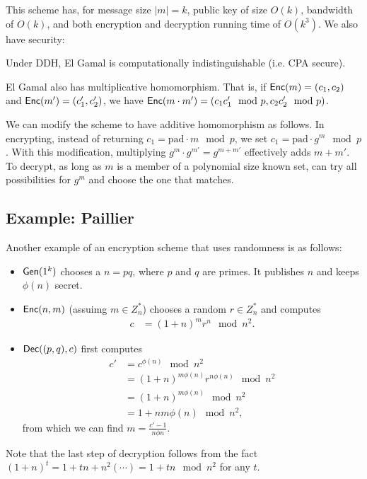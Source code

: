 \documentclass[10pt]{article}
\begin{document}
This scheme has, for message size $|m| = k$, public key of size $O(k)$, bandwidth of $O(k)$, and both encryption and decryption running time of $O(k^3)$. We also have security:
\begin{theorem}
Under DDH, El Gamal is computationally indistinguishable (i.e. CPA secure).
\end{theorem}

El Gamal also has multiplicative homomorphism. That is, if $\mathsf{Enc}(m) = (c_1, c_2)$ and $\mathsf{Enc}(m') = (c_1', c_2')$, we have $\mathsf{Enc}(m \cdot m') = (c_1c_1' \mod p, c_2c_2' \mod p)$. 

We can modify the scheme to have additive homomorphism as follows. In encrypting, instead of returning $c_1 = \text{pad} \cdot m \mod p$, we set $c_1 = \text{pad} \cdot g^m \mod p$. With this modification, multiplying $g^m \cdot g^{m'} = g^{m+m'}$ effectively adds $m+m'$. To decrypt, as long as $m$ is a member of a polynomial size known set, can try all possibilities for $g^m$ and choose the one that matches.

\subsection{Example: Paillier}

Another example of an encryption scheme that uses randomness is as follows:

\begin{itemize}
	\item $\mathsf{Gen}(1^k)$ chooses a $n=pq$, where $p$ and $q$ are primes. It publishes $n$ and keeps $\phi(n)$ secret.
	\item $\mathsf{Enc}(n,m)$ (assuimg $m \in Z_n^*$) chooses a random $r \in Z_n^*$ and computes
	\begin{align*}
	c &= (1+n)^mr^n \mod n^2.
	\end{align*}
	\item $\mathsf{Dec}((p,q),c)$ first computes
	\begin{align*}
	c' &= c^{\phi(n)} \mod n^2 \\
	&= (1+n)^{m \phi(n)} r^{n \phi(n)} \mod n^2 \\
	&= (1+n)^{m \phi(n)} \mod n^2 \\
	&= 1+nm \phi(n) \mod n^2,
	\end{align*}
	from which we can find $m = \frac{c'-1}{n \phi n}$.
\end{itemize}
Note that the last step of decryption follows from the fact $(1+n)^t = 1 + tn + n^2 ( \cdots ) = 1+tn \mod n^2$ for any $t$.
\end{document}
